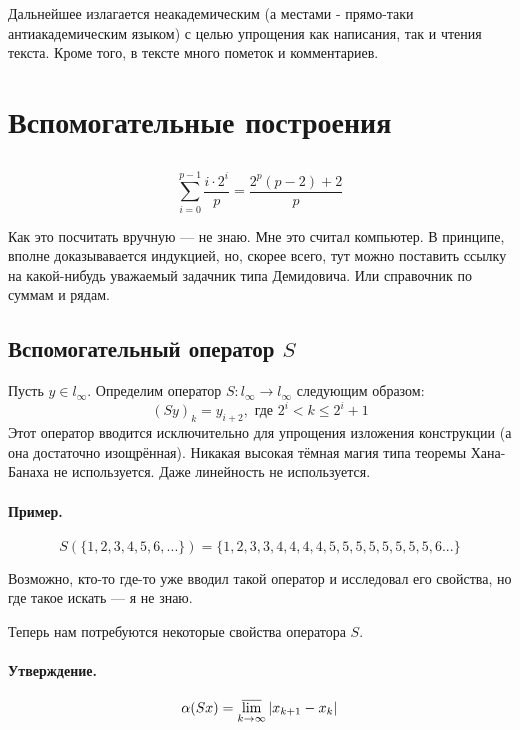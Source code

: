 \documentclass[a4paper,14pt]{article} %
\begin{document}

Дальнейшее излагается неакадемическим (а местами - прямо-таки антиакадемическим языком)
с целью упрощения как написания, так и чтения текста.
Кроме того, в тексте много пометок и комментариев.

\section{Вспомогательные построения}

\subsection{}
\begin{equation}\label{summa_drobey}
	\sum_{i=0}^{p-1} \frac{i \cdot 2^i}{p} = \frac{2^p(p-2) + 2}{p}
\end{equation}

Как это посчитать вручную --- не знаю.
Мне это считал компьютер.
В принципе, вполне доказывавается индукцией,
но, скорее всего, тут можно поставить ссылку на какой-нибудь уважаемый задачник типа Демидовича.
Или справочник по суммам и рядам.


\subsection{Вспомогательный оператор $S$}
Пусть $y\in l_\infty$.
Определим оператор $S:l_\infty \to l_\infty$ следующим образом:
\begin{equation}\label{operator_S}
	(Sy)_k = y_{i+2}, \mbox{ где } 2^i < k \leq 2^i+1
\end{equation}
Этот оператор вводится исключительно для упрощения изложения конструкции
(а она достаточно изощрённая).
Никакая высокая тёмная магия типа теоремы Хана-Банаха не используется.
Даже линейность не используется.

\paragraph{Пример.}
$$
	S(\{1,2,3,4,5,6, ...\}) = \{1,2,3,3,4,4,4,4,5,5,5,5,5,5,5,5,6...\}
$$

Возможно, кто-то где-то уже вводил такой оператор и исследовал его свойства,
но где такое искать --- я не знаю.


Теперь нам потребуются некоторые свойства оператора $S$.

\paragraph{Утверждение.}
\begin{equation}\label{alpha_S}
	\alpha(Sx) = \varlimsup_{k\to\infty} |x_{k+1} - x_{k}|
\end{equation}
\end{document}
